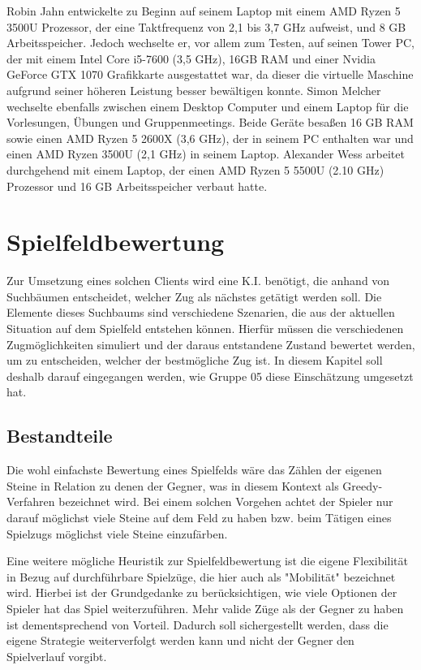 \documentclass[12pt,a4paper,bibliography=totocnumbered,listof=totocnumbered]{article}
\begin{document}
Robin Jahn entwickelte zu Beginn auf seinem Laptop mit einem AMD Ryzen 5 3500U Prozessor, der eine Taktfrequenz von 2,1 bis 3,7 GHz aufweist, und 8 GB Arbeitsspeicher. Jedoch wechselte er, vor allem zum Testen, auf seinen Tower PC, der mit einem Intel Core i5-7600 (3,5 GHz), 16GB RAM und einer Nvidia GeForce GTX 1070 Grafikkarte ausgestattet war, da dieser die virtuelle Maschine aufgrund seiner höheren Leistung besser bewältigen konnte. Simon Melcher wechselte ebenfalls zwischen einem Desktop Computer und einem Laptop für die Vorlesungen, Übungen und Gruppenmeetings. Beide Geräte besaßen 16 GB RAM sowie einen AMD Ryzen 5 2600X (3,6 GHz), der in seinem PC enthalten war und einen AMD Ryzen 3500U (2,1 GHz) in seinem Laptop. Alexander Wess arbeitet durchgehend mit einem Laptop, der einen AMD Ryzen 5 5500U (2.10 GHz) Prozessor und 16 GB Arbeitsspeicher verbaut hatte.

\newpage
\section{Spielfeldbewertung} \label{kap:Spielfeldbewertung}
Zur Umsetzung eines solchen Clients wird eine K.I. benötigt, die anhand von Suchbäumen entscheidet, welcher Zug als nächstes getätigt werden soll. Die Elemente dieses Suchbaums sind verschiedene Szenarien, die aus der aktuellen Situation auf dem Spielfeld entstehen können. Hierfür müssen die verschiedenen Zugmöglichkeiten simuliert und der daraus entstandene Zustand bewertet werden, um zu entscheiden, welcher der bestmögliche Zug ist.
In diesem Kapitel soll deshalb darauf eingegangen werden, wie Gruppe 05 diese Einschätzung umgesetzt hat.

\subsection{Bestandteile}\label{kap:Heuristik_Beschreibung}
Die wohl einfachste Bewertung eines Spielfelds wäre das Zählen der eigenen Steine in Relation zu denen der Gegner, was in diesem Kontext als Greedy-Verfahren bezeichnet wird. Bei einem solchen Vorgehen achtet der Spieler nur darauf möglichst viele Steine auf dem Feld zu haben bzw. beim Tätigen eines Spielzugs möglichst viele Steine einzufärben.

Eine weitere mögliche Heuristik zur Spielfeldbewertung ist die eigene Flexibilität in Bezug auf durchführbare Spielzüge, die hier auch als "Mobilität" bezeichnet wird. Hierbei ist der Grundgedanke zu berücksichtigen, wie viele Optionen der Spieler hat das Spiel weiterzuführen. Mehr valide Züge als der Gegner zu haben ist dementsprechend von Vorteil. Dadurch soll sichergestellt werden, dass die eigene Strategie weiterverfolgt werden kann und nicht der Gegner den Spielverlauf vorgibt.
\end{document}
